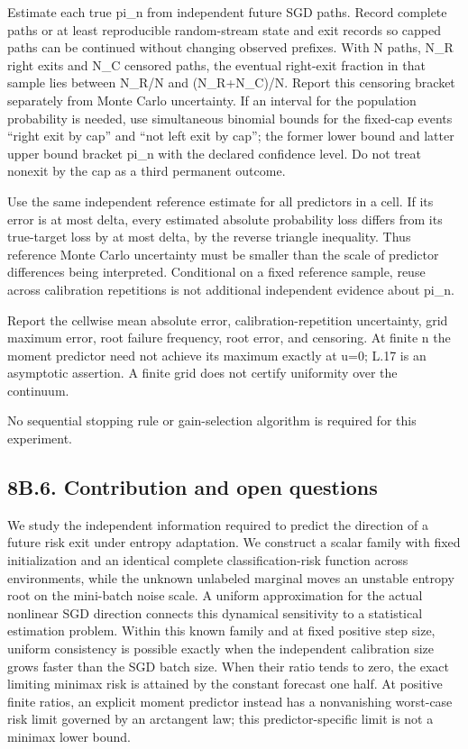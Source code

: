 Estimate each true pi\_n from independent future SGD paths. Record
complete paths or at least reproducible random-stream state and exit
records so capped paths can be continued without changing observed
prefixes. With N paths, N\_R right exits and N\_C censored paths, the
eventual right-exit fraction in that sample lies between N\_R/N and
(N\_R+N\_C)/N. Report this censoring bracket separately from Monte Carlo
uncertainty. If an interval for the population probability is needed,
use simultaneous binomial bounds for the fixed-cap events ``right exit
by cap'' and ``not left exit by cap''; the former lower bound and latter
upper bound bracket pi\_n with the declared confidence level. Do not
treat nonexit by the cap as a third permanent outcome.

Use the same independent reference estimate for all predictors in a
cell. If its error is at most delta, every estimated absolute
probability loss differs from its true-target loss by at most delta, by
the reverse triangle inequality. Thus reference Monte Carlo uncertainty
must be smaller than the scale of predictor differences being
interpreted. Conditional on a fixed reference sample, reuse across
calibration repetitions is not additional independent evidence about
pi\_n.

Report the cellwise mean absolute error, calibration-repetition
uncertainty, grid maximum error, root failure frequency, root error, and
censoring. At finite n the moment predictor need not achieve its maximum
exactly at u=0; L.17 is an asymptotic assertion. A finite grid does not
certify uniformity over the continuum.

No sequential stopping rule or gain-selection algorithm is required for
this experiment.

\subsection{8B.6. Contribution and open
questions}\label{local_prediction-b.6.-contribution-and-open-questions}

We study the independent information required to predict the direction
of a future risk exit under entropy adaptation. We construct a scalar
family with fixed initialization and an identical complete
classification-risk function across environments, while the unknown
unlabeled marginal moves an unstable entropy root on the mini-batch
noise scale. A uniform approximation for the actual nonlinear SGD
direction connects this dynamical sensitivity to a statistical
estimation problem. Within this known family and at fixed positive step
size, uniform consistency is possible exactly when the independent
calibration size grows faster than the SGD batch size. When their ratio
tends to zero, the exact limiting minimax risk is attained by the
constant forecast one half. At positive finite ratios, an explicit
moment predictor instead has a nonvanishing worst-case risk limit
governed by an arctangent law; this predictor-specific limit is not a
minimax lower bound.

